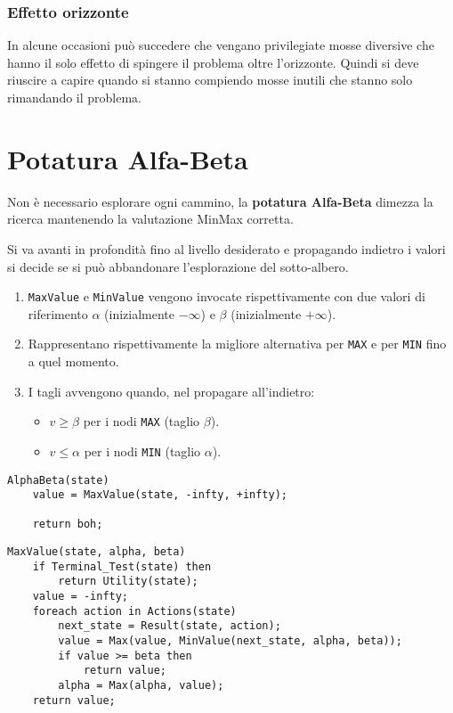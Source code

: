 \subsubsection{Effetto orizzonte}
In alcune occasioni pu\`o succedere che vengano privilegiate mosse diversive che hanno il solo effetto di spingere il
problema oltre l'orizzonte. Quindi si deve riuscire a capire quando si stanno compiendo mosse inutili che stanno solo
rimandando il problema.

\section{Potatura Alfa-Beta}
Non \`e necessario esplorare ogni cammino, la \textbf{potatura Alfa-Beta} dimezza la ricerca mantenendo la valutazione
MinMax corretta.

Si va avanti in profondit\`a fino al livello desiderato e propagando indietro i valori si
decide se si pu\`o abbandonare l'esplorazione del sotto-albero.
\begin{enumerate}
	\item \verb|MaxValue| e \verb|MinValue| vengono invocate rispettivamente con due valori di riferimento $\alpha$
	      (inizialmente $-\infty$) e $\beta$ (inizialmente $+\infty$).
	\item Rappresentano rispettivamente la migliore alternativa per \verb|MAX| e per \verb|MIN| fino a quel momento.
	\item I tagli avvengono quando, nel propagare all'indietro:
	      \begin{itemize}
		      \item $v \geq \beta$ per i nodi \verb|MAX| (taglio $\beta$).
		      \item $v \leq \alpha$ per i nodi \verb|MIN| (taglio $\alpha$).
	      \end{itemize}
\end{enumerate}

\begin{lstlisting}[style=pseudo-style]
AlphaBeta(state)
	value = MaxValue(state, -infty, +infty);

	return boh;
\end{lstlisting}

\begin{lstlisting}[style=pseudo-style]
MaxValue(state, alpha, beta)
	if Terminal_Test(state) then
		return Utility(state);
	value = -infty;
	foreach action in Actions(state)
		next_state = Result(state, action);
		value = Max(value, MinValue(next_state, alpha, beta));
		if value >= beta then
			return value;
		alpha = Max(alpha, value);
	return value;
\end{lstlisting}

